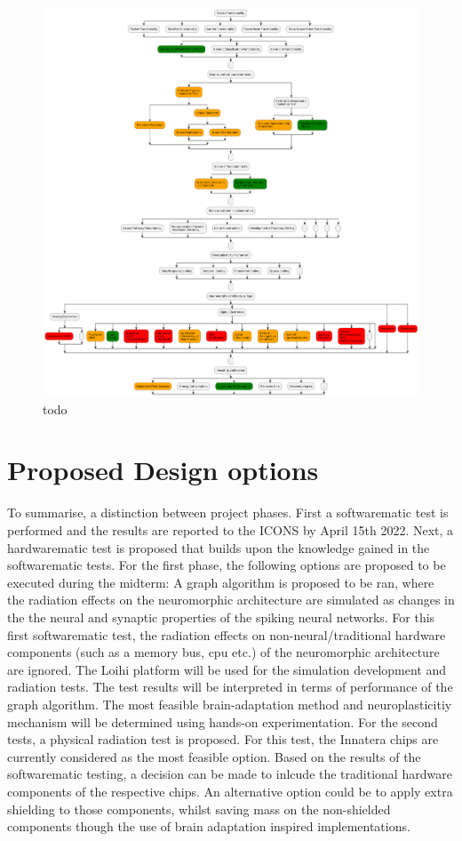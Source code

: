 \begin{figure}[H]
    \centering
    \includegraphics[width=0.6\linewidth]{latex/Images/Diagrams/dot_preliminary.png}
    \caption{todo}
    \label{fig:baseline_preliminary_dot}
\end{figure}

\section{Proposed Design options}\label{subsec:baseline_proposed_design options.}
To summarise, a distinction between project phases. First a softwarematic test is performed and the results are reported to the ICONS by  April 15th 2022. Next, a hardwarematic test is proposed that builds upon the knowledge gained in the softwarematic tests. For the first phase, the following options are proposed to be executed during the midterm: A graph algorithm is proposed to be ran, where the radiation effects on the neuromorphic architecture are simulated as changes in the the neural and synaptic properties of the spiking neural networks. For this first softwarematic test, the radiation effects on non-neural/traditional hardware components (such as a memory bus, \acrshort{cpu} etc.) of the neuromorphic architecture are ignored. The Loihi platform will be used for the simulation development and radiation tests. The test results will be interpreted in terms of performance of the graph algorithm. The most feasible brain-adaptation method and neuroplasticitiy mechanism will be determined using hands-on experimentation.
For the second tests, a physical radiation test is proposed. For this test, the Innatera chips are currently considered as the most feasible option. Based on the results of the softwarematic testing, a decision can be made to inlcude the traditional hardware components of the respective chips. An alternative option could be to apply extra shielding to those components, whilst saving mass on the non-shielded components though the use of brain adaptation inspired implementations.
